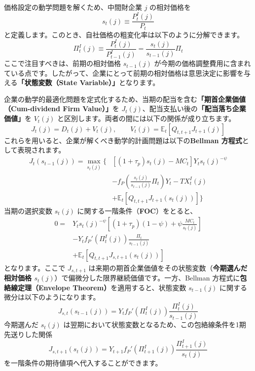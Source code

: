\documentclass[
  japanese,
  lualatex,
  ja=standard,
  12pt,
  a4paper]{ltjsarticle}
\begin{document}
価格設定の動学問題を解くため、中間財企業 \(j\) の相対価格を \[
s_t(j)\equiv \frac{P_t^I(j)}{P_t}
\]
と定義します。このとき、自社価格の粗変化率は以下のように分解できます。
\[
\Pi_t^I(j)
\equiv
\frac{P_t^I(j)}{P_{t-1}^I(j)}
=
\frac{s_t(j)}{s_{t-1}(j)}\Pi_t
\] ここで注目すべきは、前期の相対価格 \(s_{t-1}(j)\)
が今期の価格調整費用に含まれている点です。したがって、企業にとって前期の相対価格は意思決定に影響を与える\textbf{「状態変数（State
Variable）」}となります。

企業の動学的最適化問題を定式化するため、当期の配当を含む\textbf{「期首企業価値（Cum-dividend
Firm Value）」}を
\(J_t(j)\)、配当支払い後の\textbf{「配当落ち企業価値」}を \(V_t(j)\)
と区別します。両者の間には以下の関係が成り立ちます。 \[
J_t(j)=D_t(j)+V_t(j),
\qquad
V_t(j)=\mathbb{E}_t\left[Q_{t,t+1}J_{t+1}(j)\right]
\] これらを用いると、企業が解くべき動学的計画問題は以下の\textbf{Bellman
方程式}として表現されます。 \[
\begin{aligned}
J_t(s_{t-1}(j))
=\max_{s_t(j)}\Bigg\{
&\left[(1+\tau_p)s_t(j)-MC_t\right]
Y_ts_t(j)^{-\psi}\\
&-f_P\left(
\frac{s_t(j)}{s_{t-1}(j)}\Pi_t
\right)Y_t
-TX_t^I(j)\\
&+\mathbb{E}_t\left[
Q_{t,t+1}J_{t+1}(s_t(j))
\right]
\Bigg\}
\end{aligned}
\] 当期の選択変数 \(s_t(j)\) に関する一階条件（\textbf{FOC}）をとると、
\[
\begin{aligned}
0={}&
Y_ts_t(j)^{-\psi}
\left[
(1+\tau_p)(1-\psi)
+\psi\frac{MC_t}{s_t(j)}
\right]\\
&-Y_tf_P'\left(\Pi_t^I(j)\right)
\frac{\Pi_t}{s_{t-1}(j)}\\
&+\mathbb{E}_t\left[
Q_{t,t+1}J_{s,t+1}(s_t(j))
\right]
\end{aligned}
\] となります。ここで \(J_{s,t+1}\)
は来期の期首企業価値をその状態変数（\textbf{今期選んだ相対価格
\(s_t(j)\)}）で偏微分した限界継続価値です。一方、Bellman
方程式に\textbf{包絡線定理（Envelope Theorem）}を適用すると、状態変数
\(s_{t-1}(j)\) に関する微分は以下のようになります。 \[
J_{s,t}(s_{t-1}(j))
=
Y_t f_P'\left(\Pi_t^I(j)\right)
\frac{\Pi_t^I(j)}{s_{t-1}(j)}
\] 今期選んだ \(s_t(j)\)
は翌期において状態変数となるため、この包絡線条件を1期先送りした関係 \[
J_{s,t+1}(s_t(j))
=
Y_{t+1} f_P'\left(\Pi_{t+1}^I(j)\right)
\frac{\Pi_{t+1}^I(j)}{s_t(j)}
\] を一階条件の期待値項へ代入することができます。
\end{document}

